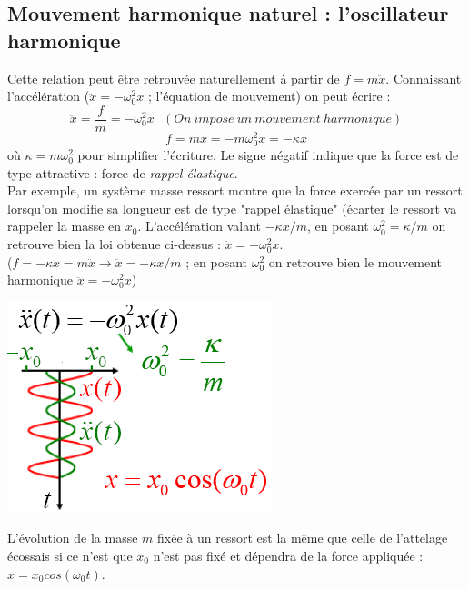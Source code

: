 \documentclass	[11pt, a4paper, openany]{book}
\begin{document}
	\subsection{Mouvement harmonique naturel : l'oscillateur harmonique}
	Cette relation peut être retrouvée naturellement à partir de $f = m\ddot{x}$. Connaissant l'accélération ($\ddot{x} = -\omega_0^2 x$ ; l'équation de mouvement) on peut écrire :
	\begin{equation}
		\ddot{x} = \frac{f}{m} = -\omega_0^2 x\ \ \ (On\ impose\ un\ mouvement\ harmonique)
	\end{equation}
	\begin{equation}
		f = m \ddot{x} = -m\omega_0^2 x = -\kappa x
	\end{equation}
	où $\kappa = m\omega_0^2$ pour simplifier l'écriture. Le signe négatif indique que la force est de type attractive : force de \textit{rappel élastique}.\\
	
	Par exemple, un système masse ressort montre que la force exercée par un ressort lorsqu'on modifie sa longueur est de type "rappel élastique" (écarter le ressort va rappeler la masse en $x_0$. L'accélération valant $-\kappa x/m$, en posant $\omega_0^2 = \kappa /m$ on retrouve bien la loi obtenue ci-dessus : $\ddot{x} = -\omega_0^2x$.\\
	($f = -\kappa x = m\ddot{x} \rightarrow \ddot{x} = -\kappa x/m$ ; en posant $\omega_0^2$ on retrouve bien le mouvement harmonique $\ddot{x} = -\omega_0^2x$)
	
	\begin{center}
		\includegraphics[scale=0.55]{oo/image1.png}
	\end{center}
	
	L'évolution de la masse $m$ fixée à un ressort est la même que celle de l'attelage écossais si ce n'est que $x_0$ n'est pas fixé et dépendra de la force appliquée : $x = x_0 cos(\omega_0 t)$.\\
	
\end{document}
